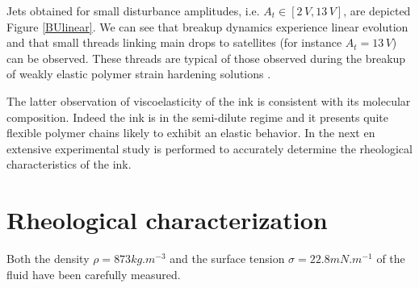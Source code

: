 \documentclass[twocolumn,10pt]{asme2ej}
\begin{document}
Jets obtained for small disturbance amplitudes, i.e. $A_t \in [2 \, V,13 \, V]$, are  depicted Figure \ref{BUlinear}. We can see that breakup dynamics experience linear evolution and that small threads linking main drops to satellites (for instance $A_t = 13 \, V$) can be observed. These threads are typical of those observed during the breakup of weakly elastic polymer strain hardening solutions \cite{christanti2002effect}.

 
The latter observation of viscoelasticity of the ink is consistent with its molecular composition. Indeed the ink is in the semi-dilute regime and it presents quite flexible polymer chains likely to exhibit an elastic behavior. In the next en extensive experimental study is performed to accurately determine the rheological characteristics of the ink.












\section{Rheological characterization}
Both the density $\rho = 873 kg.m^{-3}$ and the surface tension $\sigma = 22.8 mN.m^{-1}$ of the fluid have been carefully measured.
\end{document}
